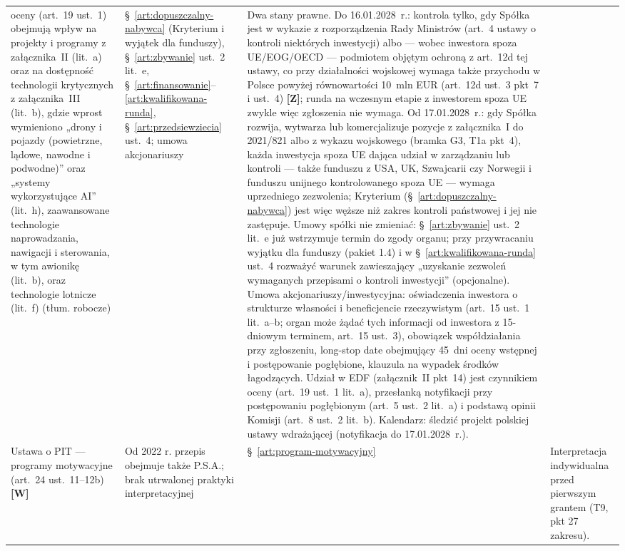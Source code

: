 \documentclass[12pt,a4paper]{report}
\newcommand{\Wiar}[1]{\textbf{[#1]}}
\begin{document}
\begin{longtable}{@{}p{3.1cm} p{3.7cm} p{3.3cm} p{4.4cm}@{}}
oceny (art.~19 ust.~1) obejmują wpływ na projekty i programy z załącznika~II (lit.~a) oraz na dostępność technologii krytycznych z załącznika~III (lit.~b), gdzie wprost wymieniono „drony i pojazdy (powietrzne, lądowe, nawodne i podwodne)” oraz „systemy wykorzystujące AI” (lit.~h), zaawansowane technologie naprowadzania, nawigacji i sterowania, w tym awionikę (lit.~b), oraz technologie lotnicze (lit.~f) (tłum. robocze) & §~\ref{art:dopuszczalny-nabywca} (Kryterium i wyjątek dla funduszy), §~\ref{art:zbywanie} ust.~2 lit.~e, §~\ref{art:finansowanie}--\ref{art:kwalifikowana-runda}, §~\ref{art:przedsiewziecia} ust.~4; umowa akcjonariuszy & Dwa stany prawne. Do 16.01.2028~r.: kontrola tylko, gdy Spółka jest w wykazie z rozporządzenia Rady Ministrów (art.~4 ustawy o kontroli niektórych inwestycji) albo --- wobec inwestora spoza UE/EOG/OECD --- podmiotem objętym ochroną z art.~12d tej ustawy, co przy działalności wojskowej wymaga także przychodu w Polsce powyżej równowartości 10~mln EUR (art.~12d ust.~3 pkt~7 i ust.~4) \Wiar{Z}; runda na wczesnym etapie z inwestorem spoza UE zwykle więc zgłoszenia nie wymaga. Od 17.01.2028~r.: gdy Spółka rozwija, wytwarza lub komercjalizuje pozycje z załącznika~I do 2021/821 albo z wykazu wojskowego (bramka G3, T1a pkt~4), każda inwestycja spoza UE dająca udział w zarządzaniu lub kontroli --- także funduszu z USA, UK, Szwajcarii czy Norwegii i funduszu unijnego kontrolowanego spoza UE --- wymaga uprzedniego zezwolenia; Kryterium (§~\ref{art:dopuszczalny-nabywca}) jest więc węższe niż zakres kontroli państwowej i jej nie zastępuje. Umowy spółki nie zmieniać: §~\ref{art:zbywanie} ust.~2 lit.~e już wstrzymuje termin do zgody organu; przy przywracaniu wyjątku dla funduszy (pakiet 1.4) i w §~\ref{art:kwalifikowana-runda} ust.~4 rozważyć warunek zawieszający „uzyskanie zezwoleń wymaganych przepisami o kontroli inwestycji” (opcjonalne). Umowa akcjonariuszy/inwestycyjna: oświadczenia inwestora o strukturze własności i beneficjencie rzeczywistym (art.~15 ust.~1 lit.~a--b; organ może żądać tych informacji od inwestora z 15-dniowym terminem, art.~15 ust.~3), obowiązek współdziałania przy zgłoszeniu, long-stop date obejmujący 45~dni oceny wstępnej i postępowanie pogłębione, klauzula na wypadek środków łagodzących. Udział w EDF (załącznik~II pkt~14) jest czynnikiem oceny (art.~19 ust.~1 lit.~a), przesłanką notyfikacji przy postępowaniu pogłębionym (art.~5 ust.~2 lit.~a) i podstawą opinii Komisji (art.~8 ust.~2 lit.~b). Kalendarz: śledzić projekt polskiej ustawy wdrażającej (notyfikacja do 17.01.2028~r.). \\
Ustawa o PIT --- programy motywacyjne (art.~24 ust.~11--12b) \Wiar{W} & Od 2022 r. przepis obejmuje także P.S.A.; brak utrwalonej praktyki interpretacyjnej & §~\ref{art:program-motywacyjny} & Interpretacja indywidualna przed pierwszym grantem (T9, pkt 27 zakresu). \\
\bottomrule
\end{longtable}
\end{document}
